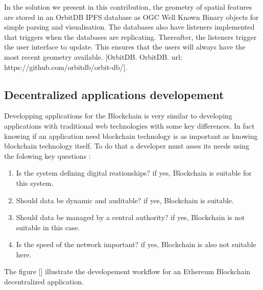 \documentclass{isprs} %
\begin{document}
In the solution we present in this contribution, the geometry of spatial features are stored in an OrbitDB IPFS database as OGC Well Known Binary objects for simple parsing and visualisation. The databases also have listeners implemented that triggers when the databases are replicating. Thereafter, the listeners trigger the user interface to update. This ensures that the users will always have the most recent geometry available. [OrbitDB. OrbitDB. url: https://github.com/orbitdb/orbit-db/].


\subsection{Decentralized applications developement}\label{sec:Decentralized applications developement}

Developping applications for the Blockchain is very similar to developing applications with traditional web technologies with some key differences. In fact knowing if an application need blockchain technology is as important as knowing blockchain technology itself. To do that a developer must asses its needs using the folowing key questions :

\begin{enumerate}
\setlength\itemsep{0em}\setlength\parskip{0em}\setlength\topsep{0em}\setlength\partopsep{0em}\setlength\parsep{0em} 
\item{Is the system defining digital reationships? if yes, Blockchain is suitable for this system.} 
\item{Should data be dynamic and auditable? if yes, Blockchain is suitable.}
\item{Should data be managed by a central authority? if yes, Blockchain is not suitable in this case.}
\item{Is the speed of the network important? if yes, Blockchain is also not suitable here.}
\end{enumerate}

The figure [] illustrate the developement workflow for an Ethereum Blockchain decentralized application.
\end{document}
